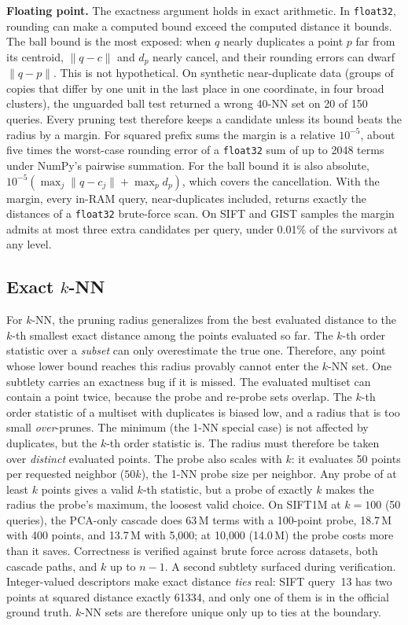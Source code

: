 \documentclass[sigconf, nonacm]{acmart}
\begin{document}
\textbf{Floating point.} The exactness argument holds in exact
arithmetic. In \texttt{float32}, rounding can make a computed bound
exceed the computed distance it bounds. The ball bound is the most
exposed: when $q$ nearly duplicates a point $p$ far from its centroid,
$\lVert q - c \rVert$ and $d_p$ nearly cancel, and their rounding errors
can dwarf $\lVert q - p \rVert$. This is not hypothetical. On synthetic
near-duplicate data (groups of copies that differ by one unit in the last
place in one coordinate, in four broad clusters), the unguarded ball test
returned a wrong 40-NN set on 20 of 150 queries. Every pruning test
therefore keeps a candidate unless its bound beats the radius by a
margin. For squared prefix sums the margin is a relative $10^{-5}$,
about five times the worst-case rounding error of a \texttt{float32} sum
of up to 2048 terms under NumPy's pairwise summation. For the ball bound
it is also absolute, $10^{-5}(\max_j \lVert q - c_j\rVert + \max_p d_p)$,
which covers the cancellation. With the margin, every in-RAM query,
near-duplicates included, returns exactly the distances of a
\texttt{float32} brute-force scan. On SIFT and GIST samples the margin
admits at most three extra candidates per query, under 0.01\% of the
survivors at any level.

\subsection{Exact $k$-NN}
\label{sec:knn}

For $k$-NN, the pruning radius generalizes from the best evaluated
distance to the $k$-th smallest exact distance among the points evaluated
so far. The $k$-th order statistic over a \emph{subset} can only
overestimate the true one. Therefore, any point whose lower bound reaches
this radius provably cannot enter the $k$-NN set. One subtlety carries an
exactness bug if it is missed. The evaluated multiset can contain a point
twice, because the probe and re-probe sets overlap. The $k$-th order
statistic of a multiset with duplicates is biased low, and a radius that
is too small \emph{over}-prunes. The minimum (the 1-NN special case) is
not affected by duplicates, but the $k$-th order statistic is. The radius
must therefore be taken over \emph{distinct} evaluated points. The probe
also scales with $k$: it evaluates 50 points per requested neighbor
($50k$), the 1-NN probe size per neighbor. Any probe of at least $k$
points gives a valid $k$-th statistic, but a probe of exactly $k$ makes
the radius the probe's maximum, the loosest valid choice. On SIFT1M at
$k=100$ (50 queries), the PCA-only cascade does 63\,M terms with a
100-point probe, 18.7\,M with 400 points, and 13.7\,M with 5{,}000; at
10{,}000 (14.0\,M) the probe costs more than it saves. Correctness is
verified against brute force across
datasets, both cascade paths, and $k$ up to $n-1$. A second subtlety
surfaced during verification. Integer-valued descriptors make exact
distance \emph{ties} real: SIFT query~13 has two points at squared
distance exactly 61334, and only one of them is in the official ground
truth. $k$-NN sets are therefore unique only up to ties at the boundary.
\end{document}
